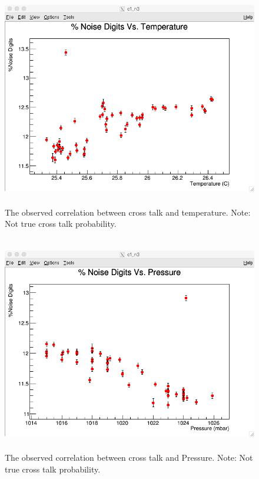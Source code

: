 \documentclass[./Thesis]{subfiles}
\begin{document}
	
\begin{figure}
	\centerline{\includegraphics[height=95mm]{NoisDigjtsVsTemp.png}}
	\caption[ Cross Talk Vs. Temperature]{ The observed correlation between cross talk and temperature. Note: Not true cross talk probability.}
	\label{fig:NoiseTemp}
\end{figure}

\begin{figure}
	\centerline{\includegraphics[height=95mm]{NoiseVsPressure.png}}
	\caption[ Cross Talk Vs. Pressure ]{ The observed correlation between cross talk and Pressure. Note: Not true cross talk probability.}
	\label{fig:NoisePress}
\end{figure}
\end{document}
